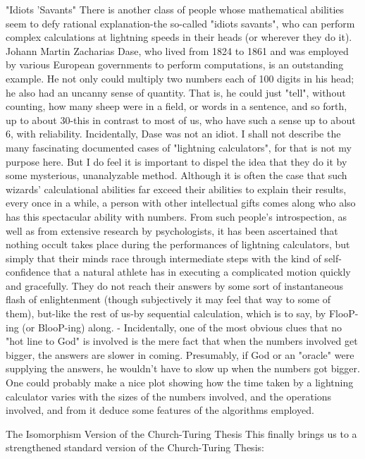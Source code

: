 {                                    "Idiots 'Savants"
There is another class of people whose mathematical abilities seem to defy rational
explanation-the so-called "idiots savants", who can perform complex calculations at
lightning speeds in their heads (or wherever they do it). Johann Martin Zacharias Dase,
who lived from 1824 to 1861 and was employed by various European governments to
perform computations, is an outstanding example. He not only could multiply two
numbers each of 100 digits in his head; he also had an uncanny sense of quantity. That is,
he could just "tell", without counting, how many sheep were in a field, or words in a
sentence, and so forth, up to about 30-this in contrast to most of us, who have such a
sense up to about 6, with reliability. Incidentally, Dase was not an idiot.
        I shall not describe the many fascinating documented cases of "lightning
calculators", for that is not my purpose here. But I do feel it is important to dispel the idea
that they do it by some mysterious, unanalyzable method. Although it is often the case
that such wizards' calculational abilities far exceed their abilities to explain their results,
every once in a while, a person with other intellectual gifts comes along who also has this
spectacular ability with numbers. From such people's introspection, as well as from
extensive research by psychologists, it has been ascertained that nothing occult takes
place during the performances of lightning calculators, but simply that their minds race
through intermediate steps with the kind of self-confidence that a natural athlete has in
executing a complicated motion quickly and gracefully. They do not reach their answers
by some sort of instantaneous flash of enlightenment (though subjectively it may feel that
way to some of them), but-like the rest of us-by sequential calculation, which is to say, by
FlooP-ing (or BlooP-ing) along. -
        Incidentally, one of the most obvious clues that no "hot line to God" is involved is
the mere fact that when the numbers involved get bigger, the answers are slower in
coming. Presumably, if God or an "oracle" were supplying the answers, he wouldn't have
to slow up when the numbers got bigger. One could probably make a nice plot showing
how the time taken by a lightning calculator varies with the sizes of the numbers
involved, and the operations involved, and from it deduce some features of the algorithms
employed.

           The Isomorphism Version of the Church-Turing Thesis
This finally brings us to a strengthened standard version of the Church-Turing Thesis:

}
